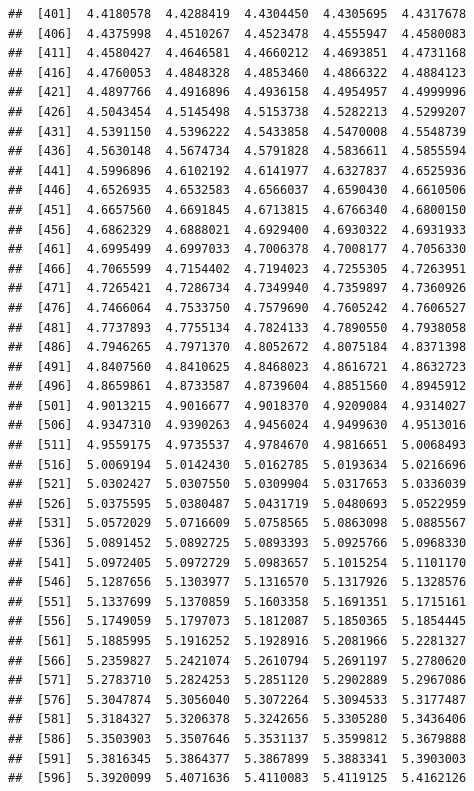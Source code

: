 \documentclass[
  11pt]{report}
\begin{document}
\begin{itemize}
\begin{verbatim}
##  [401]  4.4180578  4.4288419  4.4304450  4.4305695  4.4317678
##  [406]  4.4375998  4.4510267  4.4523478  4.4555947  4.4580083
##  [411]  4.4580427  4.4646581  4.4660212  4.4693851  4.4731168
##  [416]  4.4760053  4.4848328  4.4853460  4.4866322  4.4884123
##  [421]  4.4897766  4.4916896  4.4936158  4.4954957  4.4999996
##  [426]  4.5043454  4.5145498  4.5153738  4.5282213  4.5299207
##  [431]  4.5391150  4.5396222  4.5433858  4.5470008  4.5548739
##  [436]  4.5630148  4.5674734  4.5791828  4.5836611  4.5855594
##  [441]  4.5996896  4.6102192  4.6141977  4.6327837  4.6525936
##  [446]  4.6526935  4.6532583  4.6566037  4.6590430  4.6610506
##  [451]  4.6657560  4.6691845  4.6713815  4.6766340  4.6800150
##  [456]  4.6862329  4.6888021  4.6929400  4.6930322  4.6931933
##  [461]  4.6995499  4.6997033  4.7006378  4.7008177  4.7056330
##  [466]  4.7065599  4.7154402  4.7194023  4.7255305  4.7263951
##  [471]  4.7265421  4.7286734  4.7349940  4.7359897  4.7360926
##  [476]  4.7466064  4.7533750  4.7579690  4.7605242  4.7606527
##  [481]  4.7737893  4.7755134  4.7824133  4.7890550  4.7938058
##  [486]  4.7946265  4.7971370  4.8052672  4.8075184  4.8371398
##  [491]  4.8407560  4.8410625  4.8468023  4.8616721  4.8632723
##  [496]  4.8659861  4.8733587  4.8739604  4.8851560  4.8945912
##  [501]  4.9013215  4.9016677  4.9018370  4.9209084  4.9314027
##  [506]  4.9347310  4.9390263  4.9456024  4.9499630  4.9513016
##  [511]  4.9559175  4.9735537  4.9784670  4.9816651  5.0068493
##  [516]  5.0069194  5.0142430  5.0162785  5.0193634  5.0216696
##  [521]  5.0302427  5.0307550  5.0309904  5.0317653  5.0336039
##  [526]  5.0375595  5.0380487  5.0431719  5.0480693  5.0522959
##  [531]  5.0572029  5.0716609  5.0758565  5.0863098  5.0885567
##  [536]  5.0891452  5.0892725  5.0893393  5.0925766  5.0968330
##  [541]  5.0972405  5.0972729  5.0983657  5.1015254  5.1101170
##  [546]  5.1287656  5.1303977  5.1316570  5.1317926  5.1328576
##  [551]  5.1337699  5.1370859  5.1603358  5.1691351  5.1715161
##  [556]  5.1749059  5.1797073  5.1812087  5.1850365  5.1854445
##  [561]  5.1885995  5.1916252  5.1928916  5.2081966  5.2281327
##  [566]  5.2359827  5.2421074  5.2610794  5.2691197  5.2780620
##  [571]  5.2783710  5.2824253  5.2851120  5.2902889  5.2967086
##  [576]  5.3047874  5.3056040  5.3072264  5.3094533  5.3177487
##  [581]  5.3184327  5.3206378  5.3242656  5.3305280  5.3436406
##  [586]  5.3503903  5.3507646  5.3531137  5.3599812  5.3679888
##  [591]  5.3816345  5.3864377  5.3867899  5.3883341  5.3903003
##  [596]  5.3920099  5.4071636  5.4110083  5.4119125  5.4162126

\end{verbatim}
\end{itemize}
\end{document}
